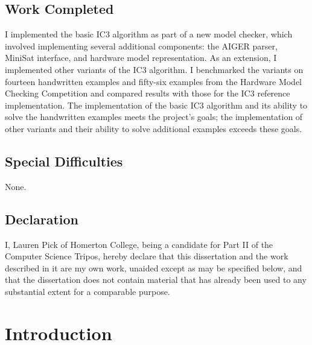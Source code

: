 \documentclass[12pt,a4paper,twoside,openright]{report}
\begin{document}
\section*{Work Completed}

I implemented the basic IC3 algorithm as part of a new model checker,
which involved implementing several additional components: the AIGER parser,
MiniSat interface, and hardware model representation.
As an extension, I implemented other variants of the IC3 algorithm.
I benchmarked the variants on fourteen handwritten examples and
fifty-six examples from the Hardware
Model Checking Competition and compared results with those for
the IC3 reference implementation. The implementation of
the basic IC3 algorithm and its ability to solve
the handwritten examples meets the project's goals;
the implementation of other variants and their ability to solve
additional examples exceeds these goals.

\section*{Special Difficulties}

None.
 
\newpage
\section*{Declaration}

I, Lauren Pick of Homerton College, being a candidate for Part II of the Computer
Science Tripos, hereby declare
that this dissertation and the work described in it are my own work,
unaided except as may be specified below, and that the dissertation
does not contain material that has already been used to any substantial
extent for a comparable purpose.

\bigskip
{}

\medskip
{}

\tableofcontents





\pagestyle{headings}

\chapter{Introduction}
\end{document}
